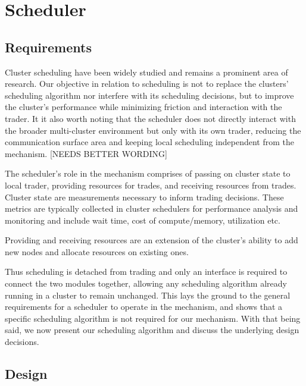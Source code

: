 \section{Scheduler}
\subsection{Requirements}
Cluster scheduling have been widely studied and remains a prominent area of
research. Our objective in relation to scheduling is not to replace the
clusters' scheduling algorithm nor interfere with its scheduling decisions, but
to improve the cluster's performance while minimizing friction and interaction
with the trader. It it also worth noting that the scheduler does not directly
interact with the broader multi-cluster environment but only with its own
trader, reducing the communication surface area and keeping local scheduling
independent from the mechanism. [NEEDS BETTER WORDING]

The scheduler's role in the mechanism comprises of passing on cluster state to
local trader, providing resources for trades, and receiving resources from
trades. Cluster state are measurements necessary to inform trading decisions.
These metrics are typically collected in cluster schedulers for performance
analysis and monitoring and include wait time, cost of compute/memory,
utilization etc.

\noindent Providing and receiving resources are an extension of the cluster's
ability to add new nodes and allocate resources on existing ones. 

Thus scheduling is detached from trading and only an interface is required to
connect the two modules together, allowing any scheduling algorithm already
running in a cluster to remain unchanged. This lays the ground to the general
requirements for a scheduler to operate in the mechanism, and shows that a
specific scheduling algorithm is not required for our mechanism. With that
being said, we now present our scheduling algorithm and discuss the underlying
design decisions. 

\subsection{Design}

